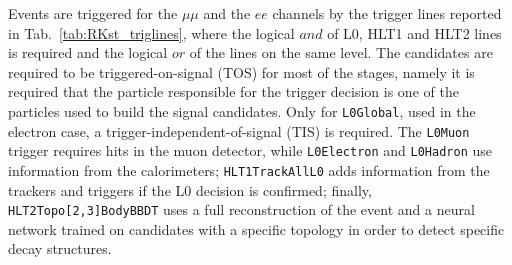 Events are triggered for the $\mu\mu$ and the $ee$ channels by the trigger lines
reported in Tab.~\ref{tab:RKst_triglines}, where the logical $and$ of L0, HLT1 and HLT2
lines is required and the logical $or$ of the lines on the same level. The candidates are
required to be triggered-on-signal (TOS) for most of the stages, namely it is required that the 
particle responsible for the trigger decision is one of the particles used to build the signal candidates.
Only for \verb!L0Global!, used in the electron case, a trigger-independent-of-signal (TIS) is required. 
The \verb!L0Muon! trigger requires hits in the muon detector, while \verb!L0Electron! and \verb!L0Hadron! use information
from the calorimeters; \verb!HLT1TrackAllL0! adds information from the trackers and
triggers if the L0 decision is confirmed; finally, \verb!HLT2Topo[2,3]BodyBBDT! uses a full reconstruction 
of the event and a neural network trained on candidates with a specific topology in order to detect specific decay structures.

\begin{table}[h!]
\begin{center}
\caption{Summary of the trigger lines used to select the $\mu\mu$ and the $ee$ channels.
Where not explicitly indicated, the lines are required to be TOS.}
\label{tab:RKst_triglines}
\end{center}
\end{table}


